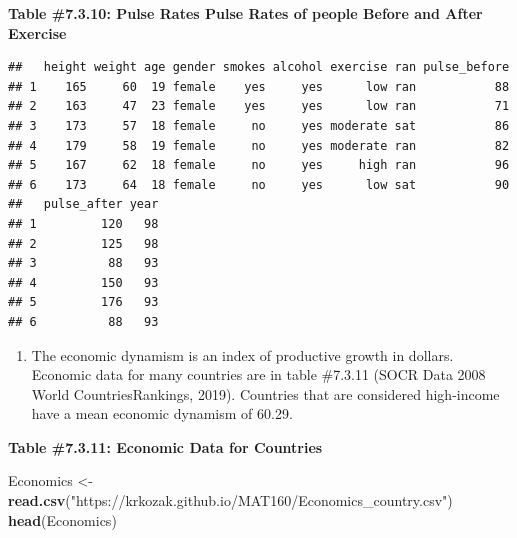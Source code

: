 \documentclass[]{book}
\newenvironment{Shaded}{\begin{snugshade}}{\end{snugshade}}
\newcommand{\KeywordTok}[1]{\textcolor[rgb]{0.13,0.29,0.53}{\textbf{#1}}}
\newcommand{\NormalTok}[1]{#1}
\newcommand{\OperatorTok}[1]{\textcolor[rgb]{0.81,0.36,0.00}{\textbf{#1}}}
\newcommand{\StringTok}[1]{\textcolor[rgb]{0.31,0.60,0.02}{#1}}
\providecommand{\tightlist}{%
  \setlength{\itemsep}{0pt}\setlength{\parskip}{0pt}}
\begin{document}
\textbf{Table \#7.3.10: Pulse Rates Pulse Rates of people Before and After Exercise}

\begin{Shaded}
\end{Shaded}

\begin{verbatim}
##   height weight age gender smokes alcohol exercise ran pulse_before
## 1    165     60  19 female    yes     yes      low ran           88
## 2    163     47  23 female    yes     yes      low ran           71
## 3    173     57  18 female     no     yes moderate sat           86
## 4    179     58  19 female     no     yes moderate ran           82
## 5    167     62  18 female     no     yes     high ran           96
## 6    173     64  18 female     no     yes      low sat           90
##   pulse_after year
## 1         120   98
## 2         125   98
## 3          88   93
## 4         150   93
## 5         176   93
## 6          88   93
\end{verbatim}

\begin{enumerate}
\def\labelenumi{\arabic{enumi}.}
\setcounter{enumi}{4}
\tightlist
\item
  The economic dynamism is an index of productive growth in dollars. Economic data for many countries are in table \#7.3.11 (SOCR Data 2008 World CountriesRankings, 2019). Countries that are considered high-income have a mean economic dynamism of 60.29.
\end{enumerate}

\textbf{Table \#7.3.11: Economic Data for Countries}

\begin{Shaded}
\begin{Highlighting}[]
\NormalTok{Economics <-}\StringTok{ }\KeywordTok{read.csv}\NormalTok{(}\StringTok{"https://krkozak.github.io/MAT160/Economics_country.csv"}\NormalTok{)}
\KeywordTok{head}\NormalTok{(Economics)}
\end{Highlighting}
\end{Shaded}
\end{document}
